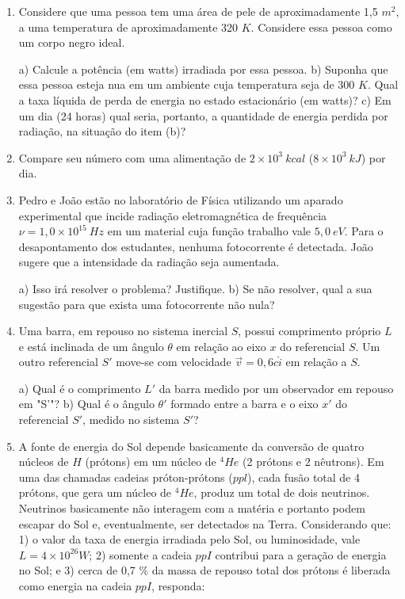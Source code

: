 \begin{enumerate}[start=1,label={\bfseries Q\arabic*.}]
\item Considere que uma pessoa tem uma área de pele de aproximadamente 1,5 $m^{2}$, a uma temperatura de aproximadamente 320 $K$. Considere essa pessoa como um corpo negro ideal.

  a) Calcule a potência (em watts) irradiada por essa pessoa.
  b) Suponha que essa pessoa esteja nua em um ambiente cuja temperatura seja de 300 $K$. Qual a taxa líquida de perda de energia no estado estacionário (em watts)?
  c) Em um dia (24 horas) qual seria, portanto, a quantidade de energia perdida por radiação, na situação do item (b)?
  \item[] Compare seu número com uma alimentação de $2 \times 10^{3} \ kcal$ ($8 \times 10^{3} \ kJ $) por dia.




\item Pedro e João estão no laboratório de Física utilizando um aparado experimental que incide radiação eletromagnética de frequência $\nu = 1,0 \times 10^{15} \ Hz$ em um material cuja função trabalho vale $5,0 \ eV$. Para o desapontamento dos estudantes, nenhuma fotocorrente é detectada. João sugere que a intensidade da radiação seja aumentada.

  a) Isso irá resolver o problema? Justifique.
  b) Se não resolver, qual a sua sugestão para que exista uma fotocorrente não nula?




\item Uma barra, em repouso no sistema inercial $S$, possui comprimento próprio $L$ e está inclinada de um ângulo $\theta$ em relação ao eixo $x$ do referencial $S$. Um outro referencial $S'$ move-se com velocidade $\vec{v} = 0,6 c \hat{i}$ em relação a $S$.

  a) Qual é o comprimento $L'$ da barra medido por um observador em repouso em "S'"?
  b) Qual é o ângulo $\theta '$ formado entre a barra e o eixo $x'$ do referencial $S'$, medido no sistema $S'$?



\item A fonte de energia do Sol depende basicamente da conversão de quatro núcleos de $H$ (prótons) em um núcleo de $^{4}He$ (2 prótons e 2 nêutrons). Em uma das chamadas cadeias próton-prótons ($ppl$), cada fusão total de 4 prótons, que gera um núcleo de $^{4}He$, produz um total de dois neutrinos. Neutrinos basicamente não interagem com a matéria e portanto podem escapar do Sol e, eventualmente, ser detectados na Terra. Considerando que: 1) o valor da taxa de energia irradiada pelo Sol, ou luminosidade, vale $L = 4 \times 10^{26} W$; 2) somente a cadeia $ppI$ contribui para a geração de energia no Sol; e 3) cerca de 0,7 $\%$ da massa de repouso total dos prótons é liberada como energia na cadeia $ppI$, responda:


\end{enumerate}
